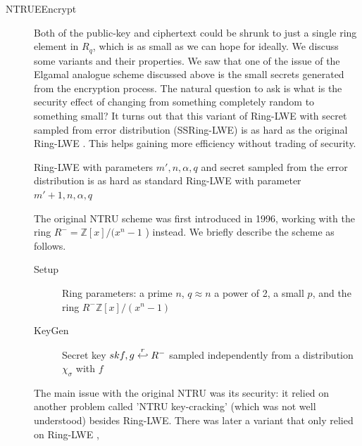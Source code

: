 \begin{description}
\begin{description}
\[    \]
  \end{description}
\item[NTRUEEncrypt \cite{hoffstein1998ntru}] Both of the public-key and
  ciphertext could be shrunk to just a single ring element in $R_q$, which is as
  small as we can hope for ideally. We discuss some variants and their
  properties. We saw that one of the issue of the Elgamal analogue scheme
  discussed above is the small secrets generated from the encryption
  process. The natural question to ask is what is the security effect of
  changing from something completely random to something small? It turns out
  that this variant of Ring-LWE with secret sampled from error distribution
  (SSRing-LWE) is as hard as the original Ring-LWE
  \cite{lyubashevsky2008lattice}. This helps gaining more efficiency without
  trading of security.

  \begin{lemma}
    \label{lem:SSRing-LWE}
    Ring-LWE with parameters \(m', n, \alpha, q\) and secret sampled from the
    error distribution is as hard as standard Ring-LWE with parameter
    \(m' + 1, n, \alpha, q\)
  \end{lemma}

  The original NTRU scheme was first introduced in 1996, working with the ring
  \(R^{-} = \mathbb{Z}[x]/(x^{n} -1 \) ) instead. We briefly describe the scheme
  as follows.
  \begin{description}
  \item[Setup] Ring parameters: a prime \(n\), \(q \approx n\) a power of 2, a
    small \(p\), and the ring \(R^{-}\mathbb{Z}[x]/(x^{n} -1 )\)
  \item[KeyGen] Secret key \(sk f, g\stackrel{r}{\hookleftarrow} R^{-} \) sampled independently
    from a distribution \(\chi_{\sigma}\) with \(f\)
  \end{description}

  The main issue with the original NTRU was its security: it relied on another
  problem called 'NTRU key-cracking' (which was not well understood) besides
  Ring-LWE. There was later a variant that only relied on Ring-LWE
  \cite{stehle2011making},
\end{description}


